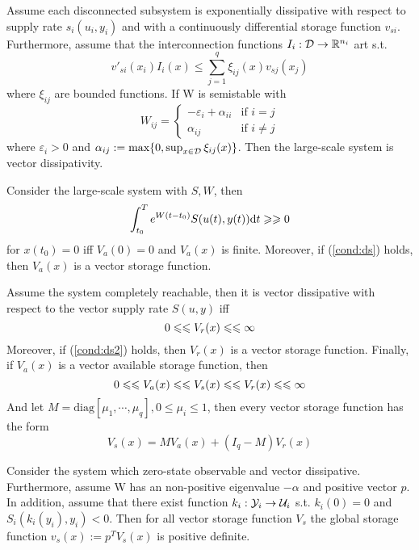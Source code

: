 \documentclass{paper}
\begin{document}
\begin{lem}\label{lem:diss_cond}
Assume each disconnected subsystem is exponentially dissipative with respect to supply rate $s_i(u_i,y_i)$ and with a continuously
differential storage function $v_{si}$. Furthermore, assume that the interconnection functions $I_i:\mathcal{D}\rightarrow \mathbb{R}^{n_i}$ art s.t.
\begin{equation}\label{eq:diss_cond}
v'_{si}(x_i)I_i(x)\leqslant \sum\limits_{j=1}^{q}\xi_{ij}(x)v_{sj}(x_j)
\end{equation}
where $\xi_{ij}$ are bounded functions. If W is semistable with
\begin{equation}
W_{ij}=
\begin{cases}
-\varepsilon_i+\alpha_{ii} & \text{if } i = j \\
\alpha_{ij} & \text{if } i \neq j
\end{cases}
\end{equation}
where $\varepsilon_i > 0$ and $\alpha_{ij}:=\text{max}\{0,\sup_{x\in\mathcal{D}}\xi_{ij}(x)\}$. Then the large-scale system is vector 
dissipativity.
\end{lem}
\begin{thm}
Consider the large-scale system with $S,W$, then
\begin{equation} \label{cond:ds}
\int_{t_0}^{T}e^{W(t-t_0)}S(u(t),y(t))\text{d} t\geqslant\geqslant 0
\end{equation}
for $x(t_0)=0$ iff $V_a(0)=0$ and $V_a(x)$ is finite. Moreover, if (\ref{cond:ds}) holds, then $V_a(x)$ is a vector storage function.
\end{thm}
\begin{thm}
Assume the system completely reachable, then it is vector dissipative with respect to the vector supply rate $S(u,y)$ iff
\begin{equation} \label{cond:ds2}
0\leqslant\leqslant V_r(x)\leqslant\leqslant\infty
\end{equation} 
Moreover, if (\ref{cond:ds2}) holds, then $V_r(x)$ is a vector storage function. Finally, if $V_a(x)$ is a vector available storage 
function, then
\begin{equation}
0\leqslant\leqslant V_a(x)\leqslant\leqslant V_s(x)\leqslant\leqslant V_r(x)\leqslant\leqslant \infty
\end{equation}
And let $M=\text{diag}[\mu_1,\cdots,\mu_q], 0\leqslant \mu_i \leqslant 1$, then every vector storage function has the form
\begin{equation}
V_s(x)=MV_a(x)+(I_q-M)V_r(x)
\end{equation} 
\end{thm}
\begin{thm}
Consider the system which zero-state observable and vector dissipative. Furthermore, assume W has an non-positive eigenvalue $-\alpha$ 
and positive vector $p$. In addition, assume that there exist function ${k_i}:{\mathcal{Y}_i}\rightarrow{\mathcal{U}_i}$ s.t. $k_i(0)=0$ and 
$S_i(k_i(y_i),y_i)<0$. Then for all vector storage function $V_s$ the global storage function $v_s(x):=p^TV_s(x)$ is positive definite.
\end{thm}
\end{document}
